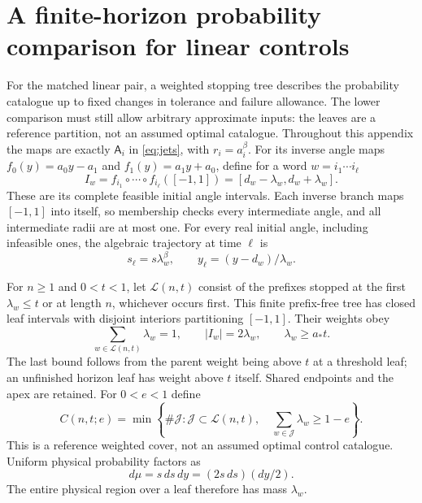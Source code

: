 \documentclass[11pt]{amsart}
\theoremstyle{definition}
\theoremstyle{remark}
\numberwithin{equation}{section}
\begin{document}
\section{A finite-horizon probability comparison for linear controls}
\label{app:linearfinite}
For the matched linear pair, a weighted stopping tree describes the
probability catalogue up to fixed changes in tolerance and failure
allowance. The lower comparison must still allow arbitrary approximate
inputs: the leaves are a reference partition, not an assumed optimal
catalogue. Throughout this appendix the maps are exactly
$\mathsf A_i$ in \eqref{eq:jets}, with $r_i=a_i^\beta$.
For its inverse angle maps $f_0(y)=a_0y-a_1$ and
$f_1(y)=a_1y+a_0$, define for a word $w=i_1\cdots i_\ell$
\[
I_w=f_{i_1}\circ\cdots\circ f_{i_\ell}([-1,1])
      =[d_w-\lambda_w,d_w+\lambda_w].
\]
These are its complete feasible initial angle intervals. Each inverse
branch maps $[-1,1]$ into itself, so membership checks every
intermediate angle, and all intermediate radii are at most one.
For every real initial angle, including infeasible ones, the
algebraic trajectory at time $\ell$ is
\begin{equation}\label{eq:linearleaftrajectory}
s_\ell=s\lambda_w^\beta,\qquad
y_\ell=(y-d_w)/\lambda_w.
\end{equation}

For $n\ge1$ and $0<t<1$, let $\mathcal L(n,t)$ consist of
the prefixes stopped at the first $\lambda_w\le t$ or at length
$n$, whichever occurs first. This finite prefix-free tree has
closed leaf intervals with disjoint interiors partitioning $[-1,1]$.
Their weights obey
\begin{equation}\label{eq:linearleafweights}
\sum_{w\in\mathcal L(n,t)}\lambda_w=1,
\qquad |I_w|=2\lambda_w,\qquad \lambda_w\ge a_*t.
\end{equation}
The last bound follows from the parent weight being above $t$
at a threshold leaf; an unfinished horizon leaf has weight above
$t$ itself. Shared endpoints and the apex are retained.
For $0<e<1$ define
\begin{equation}\label{eq:weightedcover}
C(n,t;e)=\min\left\{\#\mathcal J:
 \mathcal J\subset\mathcal L(n,t),\quad
 \sum_{w\in\mathcal J}\lambda_w\ge1-e\right\}.
\end{equation}
This is a reference weighted cover, not an assumed optimal control
catalogue. Uniform physical probability factors as
\begin{equation}\label{eq:linearfactorprob}
d\mu=s\,ds\,dy=(2s\,ds)(dy/2).
\end{equation}
The entire physical region over a leaf therefore has mass $\lambda_w$.
\end{document}
